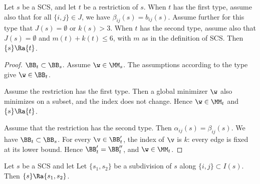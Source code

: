 \begin{lemma}[restriction]
Let $s$ be a SCS, and let $t$ be a restriction of $s$.
When $t$ has the first type, assume also that for all $\{ i , j\} \in J$, we have $\beta_{i j}(s) = b_{i j}(s)$.
Assume further for this type that $J(s)=\emptyset$ or $k(s)>3$.
When $t$ has the second type, assume also that $J(s)=\emptyset$ and $m(t)+k(t)\le 6$, with $m$ as in
the definition of SCS.
Then $\{s\}\Ra \{t\}$.
\end{lemma}

\begin{proof}
$\BB_t\subset \BB_s$. Assume
 $\w\in \MM_s$. The assumptions  according to the type give $\w\in \BB_t$.

Assume the restriction has the first type.  Then a global minimizer $\w$ also
minimizes on a subset,  and the index does not change.  Hence $\w\in \MM_t$ and $\{s\}\Ra\{t\}$.

Assume that the restriction has the second type. Then 
 $\alpha_{ij}(s)=\beta_{ij}(s)$.    We have $\BB_t\subset \BB_s$.
For every $\v\in \BB'_t$, the index of $\v$ is $k$: every edge is fixed at its lower bound.
Hence $\BB'_t = \BB''_t$, and $\w\in \MM_t$.
\end{proof}


\begin{lemma}[subdivision]
Let $s$ be a SCS and let
Let $\{s_1,s_2\}$ be a subdivision of $s$ along $\{i,j\}\subset I(s)$.
Then $\{s\}\Ra\{s_1,s_2\}$.
\end{lemma}

